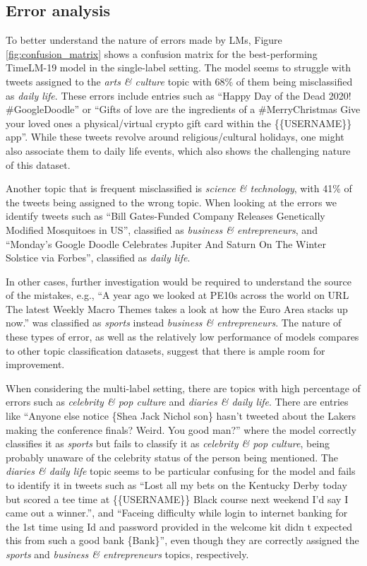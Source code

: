 \subsection{Error analysis}
\label{erroranalysis}
To better understand the nature of errors made by \acp{LM}, Figure \ref{fig:confusion_matrix} shows a confusion matrix for the best-performing TimeLM-19 model in the single-label setting.
The model seems to struggle with tweets assigned to the \textit{arts \& culture} topic with 68\% of them being misclassified as \textit{daily life}.
These errors include entries such as ``Happy Day of the Dead 2020! \#GoogleDoodle'' 
or ``Gifts of love are the ingredients of a \#MerryChristmas  Give 
your loved ones a physical/virtual crypto gift card within the \{\{USERNAME\}\} app''. 
While these tweets revolve around religious/cultural holidays, one might also associate them to daily life events, which also shows the challenging nature of this dataset.

Another topic that is frequent misclassified is \textit{science \& technology}, with 41\% of the tweets being assigned to the wrong topic. When looking at the errors we identify tweets such as ``Bill Gates-Funded Company Releases Genetically Modified Mosquitoes in US'', classified as \textit{business \& entrepreneurs}, and ``Monday’s Google Doodle Celebrates Jupiter And Saturn On The Winter Solstice via Forbes'', classified as \textit{daily life}.

In other cases, further investigation would be required to understand the source of the mistakes, e.g., ``A year ago we looked at PE10s across the world on {{URL}} The latest Weekly Macro Themes takes a look at how the Euro Area stacks up now.'' was classified as \textit{sports} instead \textit{business \& entrepreneurs}. The nature of these types of error, as well as the relatively low performance of models compares to other topic classification datasets, suggest that there is ample room for improvement.

When considering the multi-label setting, there are topics with high percentage of errors such as \textit{celebrity \& pop culture} and \textit{diaries \& daily life}. There are entries like ``Anyone else notice \{\@O Shea Jack Nichol son\@\} hasn’t tweeted about the Lakers making the conference finals? Weird. You good man?'' where the model correctly classifies it as \textit{sports} but fails to classify it as \textit{celebrity \& pop culture}, being probably unaware of the celebrity status of the person being mentioned. The \textit{diaries \& daily life} topic seems to be particular confusing for the model and fails to identify it in tweets such as ``Lost all my bets on the Kentucky Derby today but scored a tee time at \{\{USERNAME\}\} Black course next weekend I’d say I came out a winner.'', and ``Faceing difficulty while login to internet banking for the 1st time using Id and password provided in the welcome kit didn t expected this from such a good bank \{\@Canara Bank\@\}'',
even though they are correctly assigned the \textit{sports} and \textit{business \& entrepreneurs} topics, respectively. 

